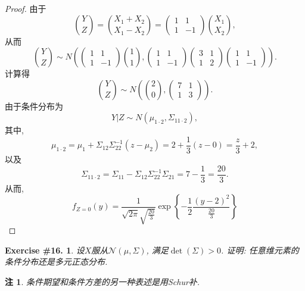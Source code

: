 \documentclass[UTF8, a4paper]{article}
\newtheorem{exercise}{Exercise \#16.}
\newtheorem*{remark}{注}
\begin{document}
\begin{proof}
由于 
$$
\binom{Y}{Z} = \binom{X_1 + X_2}{X_1 - X_2} = \left(\begin{array}{cc}
    1 & 1 \\
    1 & -1  
\end{array}\right) \binom{X_1}{X_2},
$$
从而 
$$
\binom{Y}{Z} \sim N\left(\left(\begin{array}{cc}
    1 & 1 \\
    1 & -1  
\end{array}\right)\binom{1}{1}, \left(\begin{array}{cc}
    1 & 1 \\
    1 & -1  
\end{array}\right)
\left(\begin{array}{cc}
    3 & 1 \\
    1 & 2
    \end{array}\right)
\left(\begin{array}{cc}
    1 & 1 \\
    1 & -1  
\end{array}\right)
\right).
$$
计算得
$$
\binom{Y}{Z} \sim N\left(\binom{2}{0}, \left(\begin{array}{cc}
    7 & 1 \\ 
    1 & 3
\end{array}\right)\right).
$$
由于条件分布为 
$$
Y|Z \sim N(\mu_{1\cdot 2}, \Sigma_{11\cdot 2}), 
$$
其中, 
$$
\mu_{1\cdot 2} = \mu_1 + \Sigma_{12}\Sigma_{22}^{-1}(z - \mu_2) = 2 + \frac{1}{3}(z - 0) = \frac{z}{3} + 2,
$$
以及
$$
\Sigma_{11\cdot 2} = \Sigma_{11} - \Sigma_{12}\Sigma_{22}^{-1}\Sigma_{21} = 7 - \frac{1}{3} = \frac{20}{3}.
$$
从而, 
$$
f_{Z=0}(y)=\frac{1}{\sqrt{2 \pi} \sqrt{\frac{20}{3}}} \exp \left\{-\frac{1}{2} \frac{(y-2)^2}{\frac{20}{3}}\right\}
$$
\end{proof}


\begin{framed}
\begin{exercise}
设\(X\)服从\(\mathcal{N}(\mu, \Sigma)\), 满足\(\det(\Sigma) > 0\).
证明: 任意维元素的条件分布还是多元正态分布.
\end{exercise}
\end{framed}

\begin{remark}
条件期望和条件方差的另一种表述是用Schur补.
\end{remark}
\end{document}
